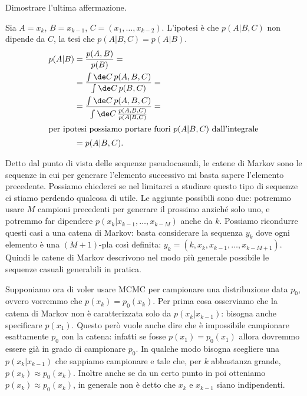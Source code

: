 \begin{exercise}
    Dimostrare l'ultima affermazione.
\end{exercise}

\begin{solution}
    Sia $A=x_k$, $B=x_{k-1}$, $C=(x_1,\dots,x_{k-2})$. L'ipotesi è che
    $p(A|B,C)$ non dipende da $C$, la tesi che $p(A|B,C)=p(A|B)$.
    \begin{align*}
        p(A|B)
        &= \frac{p(A,B)}{p(B)} = \\
        &= \frac {\int \de C\, p(A,B,C)} {\int \de C\, p(B,C)} = \\
        &= \frac {\int \de C\, p(A,B,C)} {\int \de C\, \frac {p(A,B,C)} {p(A|B,C)}} = \\
        \intertext{per ipotesi possiamo portare fuori $p(A|B,C)$ dall'integrale}
        &= p(A|B,C).
    \end{align*}
\end{solution}

Detto dal punto di vista delle sequenze pseudocasuali, le catene di Markov sono
le sequenze in cui per generare l'elemento successivo mi basta sapere
l'elemento precedente. Possiamo chiederci se nel limitarci a studiare questo
tipo di sequenze ci stiamo perdendo qualcosa di utile. Le aggiunte possibili
sono due: potremmo usare $M$ campioni precedenti per generare il prossimo
anziché solo uno, e potremmo far dipendere $p(x_k|x_{k-1},\dots,x_{k-M})$ anche
da $k$. Possiamo ricondurre questi casi a una catena di Markov: basta
considerare la sequenza $y_k$ dove ogni elemento è una $(M+1)$-pla così
definita: $y_k = (k, x_k, x_{k-1}, \dots, x_{k-M+1})$. Quindi le catene di
Markov descrivono nel modo più generale possibile le sequenze casuali
generabili in pratica.

Supponiamo ora di voler usare MCMC per campionare una distribuzione data $p_0$,
ovvero vorremmo che $p(x_k) = p_0(x_k)$. Per prima cosa osserviamo che la
catena di Markov non è caratterizzata solo da $p(x_k|x_{k-1})$: bisogna anche
specificare $p(x_1)$. Questo però vuole anche dire che è impossibile campionare
esattamente $p_0$ con la catena: infatti se fosse $p(x_1) = p_0(x_1)$ allora
dovremmo essere già in grado di campionare $p_0$. In qualche modo bisogna
scegliere una $p(x_k|x_{k-1})$ che sappiamo campionare e tale che, per $k$
abbastanza grande, $p(x_k) \approx p_0(x_k)$. Inoltre anche se da un certo punto
in poi otteniamo $p(x_k) \approx p_0(x_k)$, in generale non è detto che
$x_k$ e $x_{k-1}$ siano indipendenti.

